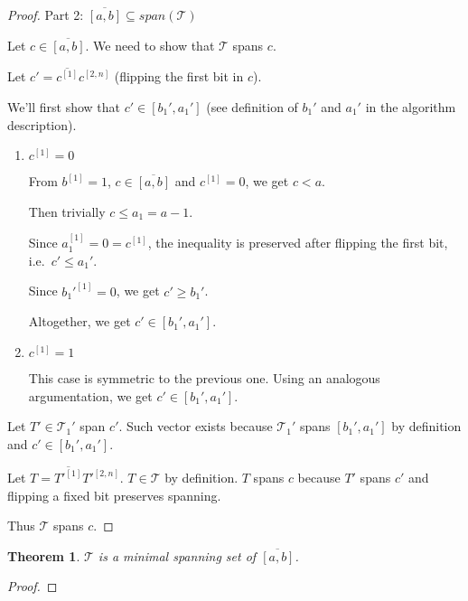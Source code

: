 \documentclass{article}
\theoremstyle{plain}
\newtheorem{theorem}{Theorem}[subsection]
\theoremstyle{definition}
\newcommand{\interval}[2]{[#1, #2]}
\newcommand{\compl}[1]{\overline{#1}}
\newcommand{\finterval}[2]{\compl{\interval{#1}{#2}}}
\newcommand{\bit}[2]{#1^{[#2]}}
\newcommand{\bits}[3]{#1^{\interval{#2}{#3}}}
\begin{document}
\begin{proof}
Part 2: $\finterval{a}{b} \subseteq span(\mathcal{T})$

Let $c \in \finterval{a}{b}$.
We need to show that $\mathcal{T}$ spans $c$.

Let $c' = \compl{\bit{c}{1}} \bits{c}{2}{n}$
(flipping the first bit in $c$).

We'll first show that $c' \in \interval{b_1'}{a_1'}$
(see definition of $b_1'$ and $a_1'$
in the algorithm description).

\begin{enumerate}
\item $\bit{c}{1} = 0$

From $\bit{b}{1} = 1$,
$c \in \finterval{a}{b}$
and $\bit{c}{1} = 0$,
we get $c < a$.

Then trivially $c \leq a_1 = a - 1$.

Since $\bit{a_1}{1} = 0 = \bit{c}{1}$,
the inequality is preserved after flipping the first bit,
i.e.~$c' \leq a_1'$.

Since $\bit{b_1'}{1} = 0$, we get $c' \geq b_1'$.

Altogether, we get $c' \in \interval{b_1'}{a_1'}$.
\item $\bit{c}{1} = 1$

This case is symmetric to the previous one.
Using an analogous argumentation,
we get $c' \in \interval{b_1'}{a_1'}$.
\end{enumerate}

Let $T' \in \mathcal{T}_1'$ span $c'$.
Such vector exists because
$\mathcal{T}_1'$ spans $\interval{b_1'}{a_1'}$
by definition
and $c' \in \interval{b_1'}{a_1'}$.

Let $T = \compl{\bit{T'}{1}} \bits{T'}{2}{n}$.
$T \in \mathcal{T}$ by definition.
$T$ spans $c$ because $T'$ spans $c'$
and flipping a fixed bit preserves spanning.

Thus $\mathcal{T}$ spans $c$.
\end{proof}

\begin{theorem}
$\mathcal{T}$ is a minimal spanning set of $\finterval{a}{b}$.
\end{theorem}

\begin{proof}
\end{proof}




\printglossaries
\end{document}

